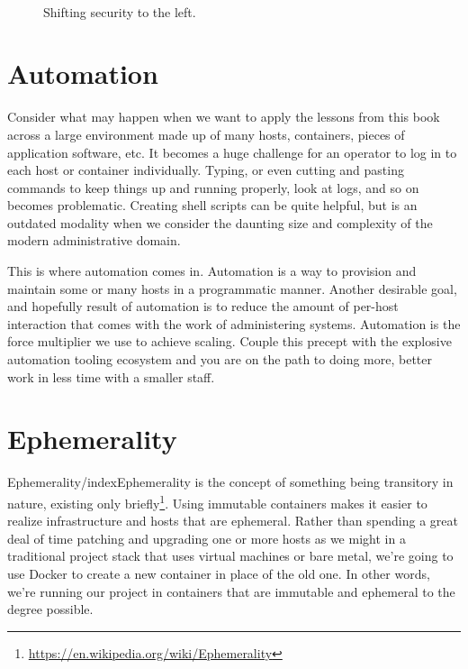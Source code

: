\justify
\begin{figure}[!htb]
	\centering
	\\
	\caption{Shifting security to the left.}
	\label{fig:shift}
\end{figure}

\section{Automation}

\justify
Consider what may happen when we want to apply the lessons from this book across a large environment made up of many hosts, containers, pieces of application software, etc. It becomes a huge challenge for an operator to log in to each host or container individually. Typing, or even cutting and pasting commands to keep things up and running properly, look at logs, and so on becomes problematic. Creating shell scripts can be quite helpful, but is an outdated modality when we consider the daunting size and complexity of the modern administrative domain.

\justify
This is where automation comes in. Automation is a way to provision and maintain some or many hosts in a programmatic manner. Another desirable goal, and hopefully result of automation is to reduce the amount of per-host interaction that comes with the work of administering systems. Automation is the force multiplier we use to achieve scaling. Couple this precept with the explosive automation tooling ecosystem and you are on the path to doing more, better work in less time with a smaller staff. 

\section{Ephemerality}

\justify
Ephemerality/index{Ephemerality} is the concept of something being transitory in nature,
existing only briefly\footnote{\url{https://en.wikipedia.org/wiki/Ephemerality}}.
Using immutable containers makes it easier to realize infrastructure and
hosts that are ephemeral. Rather than spending a great deal of time
patching and upgrading one or more hosts as we might in a traditional
project stack that uses virtual machines or bare metal, we're going to
use Docker to create a new container in place of the old one. In other
words, we're running our project in containers that are immutable and
ephemeral to the degree possible.

